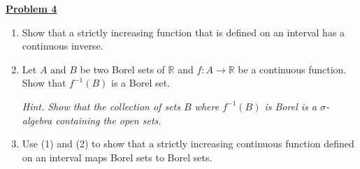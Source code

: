 \noindent \underline{\textbf{Problem 4}}
\begin{enumerate}
	\item Show that a strictly increasing function that is defined on an interval has a continuous inverse.
	\item Let \( A \) and \( B \) be two Borel sets of \( \mathbb{R} \) and \( f : A \to \mathbb{R} \) be a continuous function. Show that \( f^{-1}(B)  \) is a Borel set.

		\emph{Hint. Show that the collection of sets \( B \) where \( f^{-1} (B) \) is Borel is a \(\sigma\)-algebra containing the open sets.} 
	\item Use (1) and (2) to show that a strictly increasing continuous function defined on an interval maps Borel sets to Borel sets.	
\end{enumerate}

